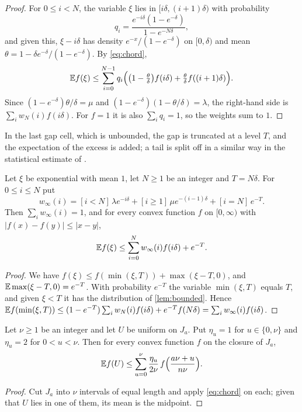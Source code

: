 \begin{proof}
For $0\le i<N$, the variable $\xi$ lies in $[i\delta,(i+1)\delta)$ with probability
\[
q_i=\frac{e^{-i\delta}(1-e^{-\delta})}{1-e^{-N\delta}},
\]
and given this, $\xi-i\delta$ has density $e^{-x}/(1-e^{-\delta})$ on $[0,\delta)$ and mean $\theta=1-\delta e^{-\delta}/(1-e^{-\delta})$. By \eqref{eq:chord},
\[
\mathbb{E} f(\xi)\le\sum_{i=0}^{N-1}q_i\Bigl(\bigl(1-\tfrac{\theta}{\delta}\bigr)f(i\delta)+\tfrac{\theta}{\delta}f((i+1)\delta)\Bigr).
\]
Since $(1-e^{-\delta})\theta/\delta=\mu$ and $(1-e^{-\delta})(1-\theta/\delta)=\lambda$, the right-hand side is $\sum_iw_N(i)f(i\delta)$. For $f=1$ it is also $\sum_iq_i=1$, so the weights sum to $1$.
\end{proof}

In the last gap cell, which is unbounded, the gap is truncated at a level $T$, and the expectation of the excess is added; a tail is split off in a similar way in the statistical estimate of \cite[Section~4.3]{DongCao2026}.

\begin{lem}\label{lem:unbounded}
Let $\xi$ be exponential with mean $1$, let $N\ge1$ be an integer and $T=N\delta$. For $0\le i\le N$ put
\[
w_\infty(i)=[i<N]\,\lambda e^{-i\delta}+[i\ge1]\,\mu e^{-(i-1)\delta}+[i=N]\,e^{-T}.
\]
Then $\sum_iw_\infty(i)=1$, and for every convex function $f$ on $[0,\infty)$ with $|f(x)-f(y)|\le|x-y|$,
\[
\mathbb{E} f(\xi)\le\sum_{i=0}^{N}w_\infty(i)f(i\delta)+e^{-T}.
\]
\end{lem}

\begin{proof}
We have $f(\xi)\le f(\min(\xi,T))+\max(\xi-T,0)$, and $\mathbb{E}\max(\xi-T,0)=e^{-T}$. With probability $e^{-T}$ the variable $\min(\xi,T)$ equals $T$, and given $\xi<T$ it has the distribution of \cref{lem:bounded}. Hence $\mathbb{E} f(\min(\xi,T))\le(1-e^{-T})\sum_iw_N(i)f(i\delta)+e^{-T}f(N\delta)=\sum_iw_\infty(i)f(i\delta)$.
\end{proof}

\begin{lem}[Heights]\label{lem:heights}
Let $\nu\ge1$ be an integer and let $U$ be uniform on $J_a$. Put $\eta_u=1$ for $u\in\{0,\nu\}$ and $\eta_u=2$ for $0<u<\nu$. Then for every convex function $f$ on the closure of $J_a$,
\[
\mathbb{E} f(U)\le\sum_{u=0}^{\nu}\frac{\eta_u}{2\nu}\,f\Bigl(\frac{a\nu+u}{n\nu}\Bigr).
\]
\end{lem}

\begin{proof}
Cut $J_a$ into $\nu$ intervals of equal length and apply \eqref{eq:chord} on each; given that $U$ lies in one of them, its mean is the midpoint.
\end{proof}

